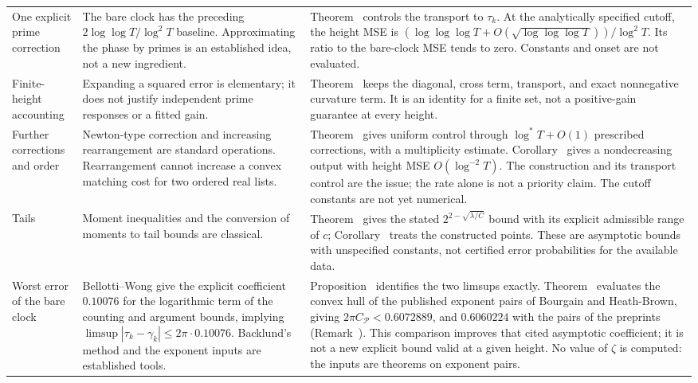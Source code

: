 \documentclass[preprint,12pt]{elsarticle}
\makeatletter
\let\CG@origref\ref
\newcommand{\CG@gettip}[1]{\@ifundefined{CGTip@#1}{Reference: #1}{\csname CGTip@#1\endcsname}}
\DeclareRobustCommand{\CGref}[1]{\pdftooltip{\CG@origref{#1}}{\CG@gettip{#1}}}
\numberwithin{equation}{section}
\theoremstyle{plain}
\theoremstyle{definition}
\theoremstyle{remark}
\makeatother
\begin{document}
\begin{longtable}{@{}p{}p{}p{}@{}}
One explicit prime correction
& The bare clock has the preceding $2\log\log T/\log^2T$ baseline. Approximating the phase by primes is an established idea, not a new ingredient.
& Theorem~\CGref{thm:computable_clock} controls the transport to $\tau_k$. At the analytically specified cutoff, the height MSE is $(\log\log\log T+O(\sqrt{\log\log\log T}))/\log^2T$. Its ratio to the bare-clock MSE tends to zero. Constants and onset are not evaluated.\\
Finite-height accounting
& Expanding a squared error is elementary; it does not justify independent prime responses or a fitted gain.
& Theorem~\CGref{thm:accounting} keeps the diagonal, cross term, transport, and exact nonnegative curvature term. It is an identity for a finite set, not a positive-gain guarantee at every height.\\
Further corrections and order
& Newton-type correction and increasing rearrangement are standard operations. Rearrangement cannot increase a convex matching cost for two ordered real lists.
& Theorem~\CGref{thm:uniform_iteration} gives uniform control through $\log^*T+O(1)$ prescribed corrections, with a multiplicity estimate. Corollary~\CGref{cor:sorted_clock} gives a nondecreasing output with height MSE $O(\log^{-2}T)$. The construction and its transport control are the issue; the rate alone is not a priority claim. The cutoff constants are not yet numerical.\\
Tails
& Moment inequalities and the conversion of moments to tail bounds are classical.
& Theorem~\CGref{thm:tails} gives the stated $2^{2-\sqrt{\lambda/C}}$ bound with its explicit admissible range of $c$; Corollary~\CGref{cor:clock_tails} treats the constructed points. These are asymptotic bounds with unspecified constants, not certified error probabilities for the available data.\\
Worst error of the bare clock
& Bellotti--Wong \cite[Thm.~1.1, Cor.~1.5]{BellottiWong2025} give the explicit coefficient $0.10076$ for the logarithmic term of the counting and argument bounds, implying $\limsup|\tau_k-\gamma_k|\le2\pi\cdot0.10076$. Backlund's method and the exponent inputs are established tools.
& Proposition~\CGref{prop:envelope_equivalence} identifies the two limsups exactly. Theorem~\CGref{thm:envelope} evaluates the convex hull of the published exponent pairs of Bourgain and Heath-Brown, giving $2\pi C_{\mathcal P}<0.6072889$, and $0.6060224$ with the pairs of the preprints \cite{TrudgianYang2023,TaoTrudgianYang2025} (Remark~\CGref{rem:envelope_inputs}). This comparison improves that cited asymptotic coefficient; it is not a new explicit bound valid at a given height. No value of $\zeta$ is computed: the inputs are theorems on exponent pairs.\\

\end{longtable}
\end{document}
